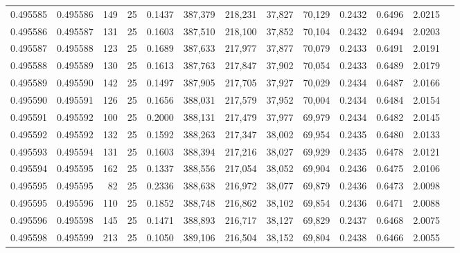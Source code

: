 \begin{tabular}{rrrrrrrrrrrrr}
0.495585 & 0.495586 &   149 &  25 &                                     0.1437 & 387,379 & 218,231 &  37,827 &  70,129 & 0.2432 & 0.6496 & 2.0215 \\
0.495586 & 0.495587 &   131 &  25 &                                     0.1603 & 387,510 & 218,100 &  37,852 &  70,104 & 0.2432 & 0.6494 & 2.0203 \\
0.495587 & 0.495588 &   123 &  25 &                                     0.1689 & 387,633 & 217,977 &  37,877 &  70,079 & 0.2433 & 0.6491 & 2.0191 \\
0.495588 & 0.495589 &   130 &  25 &                                     0.1613 & 387,763 & 217,847 &  37,902 &  70,054 & 0.2433 & 0.6489 & 2.0179 \\
0.495589 & 0.495590 &   142 &  25 &                                     0.1497 & 387,905 & 217,705 &  37,927 &  70,029 & 0.2434 & 0.6487 & 2.0166 \\
0.495590 & 0.495591 &   126 &  25 &                                     0.1656 & 388,031 & 217,579 &  37,952 &  70,004 & 0.2434 & 0.6484 & 2.0154 \\
0.495591 & 0.495592 &   100 &  25 &                                     0.2000 & 388,131 & 217,479 &  37,977 &  69,979 & 0.2434 & 0.6482 & 2.0145 \\
0.495592 & 0.495592 &   132 &  25 &                                     0.1592 & 388,263 & 217,347 &  38,002 &  69,954 & 0.2435 & 0.6480 & 2.0133 \\
0.495593 & 0.495594 &   131 &  25 &                                     0.1603 & 388,394 & 217,216 &  38,027 &  69,929 & 0.2435 & 0.6478 & 2.0121 \\
0.495594 & 0.495595 &   162 &  25 &                                     0.1337 & 388,556 & 217,054 &  38,052 &  69,904 & 0.2436 & 0.6475 & 2.0106 \\
0.495595 & 0.495595 &    82 &  25 &                                     0.2336 & 388,638 & 216,972 &  38,077 &  69,879 & 0.2436 & 0.6473 & 2.0098 \\
0.495595 & 0.495596 &   110 &  25 &                                     0.1852 & 388,748 & 216,862 &  38,102 &  69,854 & 0.2436 & 0.6471 & 2.0088 \\
0.495596 & 0.495598 &   145 &  25 &                                     0.1471 & 388,893 & 216,717 &  38,127 &  69,829 & 0.2437 & 0.6468 & 2.0075 \\
0.495598 & 0.495599 &   213 &  25 &                                     0.1050 & 389,106 & 216,504 &  38,152 &  69,804 & 0.2438 & 0.6466 & 2.0055 \\

\end{tabular}
